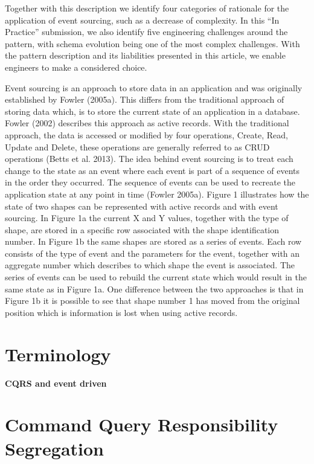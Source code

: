 Together with this description we identify four categories of rationale for the application of event sourcing, such as a decrease of complexity. In this “In Practice” submission, we also identify five engineering challenges around the pattern, with schema evolution being one of the most complex challenges. With the pattern description and its liabilities presented in this article, we enable engineers to make a considered choice.


Event sourcing is an approach to store data in an application and was originally established by
Fowler (2005a). This differs from the traditional approach of storing data which, is to store the
current state of an application in a database. Fowler (2002) describes this approach as active
records. With the traditional approach, the data is accessed or modified by four operations,
Create, Read, Update and Delete, these operations are generally referred to as CRUD operations
(Betts et al. 2013). The idea behind event sourcing is to treat each change to the state as an
event where each event is part of a sequence of events in the order they occurred. The sequence
of events can be used to recreate the application state at any point in time (Fowler 2005a).
Figure 1 illustrates how the state of two shapes can be represented with active records and with
event sourcing. In Figure 1a the current X and Y values, together with the type of shape, are
stored in a specific row associated with the shape identification number. In Figure 1b the same
shapes are stored as a series of events. Each row consists of the type of event and the parameters
for the event, together with an aggregate number which describes to which shape the event is
associated. The series of events can be used to rebuild the current state which would result in
the same state as in Figure 1a. One difference between the two approaches is that in Figure 1b it
is possible to see that shape number 1 has moved from the original position which is information
is lost when using active records.

\section{Terminology}

\textbf{CQRS and event driven}

\section{Command Query Responsibility Segregation}

